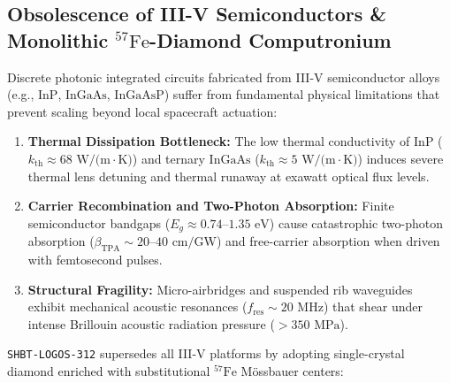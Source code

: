 \documentclass[11pt,onecolumn]{article}
\begin{document}
\subsection{Obsolescence of III-V Semiconductors \& Monolithic \texorpdfstring{$^{57}\text{Fe}$-Diamond}{57Fe-Diamond} Computronium}
\label{sec:logos_borrmann_computronium}

Discrete photonic integrated circuits fabricated from III-V semiconductor alloys (e.g., $\text{InP}$, $\text{InGaAs}$, $\text{InGaAsP}$) suffer from fundamental physical limitations that prevent scaling beyond local spacecraft actuation:
\begin{enumerate}
    \item \textbf{Thermal Dissipation Bottleneck:} The low thermal conductivity of $\text{InP}$ ($k_{\text{th}} \approx 68\text{ W/(m}\cdot\text{K)}$) and ternary $\text{InGaAs}$ ($k_{\text{th}} \approx 5\text{ W/(m}\cdot\text{K)}$) induces severe thermal lens detuning and thermal runaway at exawatt optical flux levels.
    \item \textbf{Carrier Recombination and Two-Photon Absorption:} Finite semiconductor bandgaps ($E_g \approx 0.74\text{--}1.35\text{ eV}$) cause catastrophic two-photon absorption ($\beta_{\text{TPA}} \sim 20\text{--}40\text{ cm/GW}$) and free-carrier absorption when driven with femtosecond pulses.
    \item \textbf{Structural Fragility:} Micro-airbridges and suspended rib waveguides exhibit mechanical acoustic resonances ($f_{\text{res}} \sim 20\text{ MHz}$) that shear under intense Brillouin acoustic radiation pressure ($> 350\text{ MPa}$).
\end{enumerate}

\texttt{SHBT-LOGOS-312} supersedes all III-V platforms by adopting single-crystal diamond enriched with substitutional $^{57}\text{Fe}$ Mössbauer centers:
\end{document}
